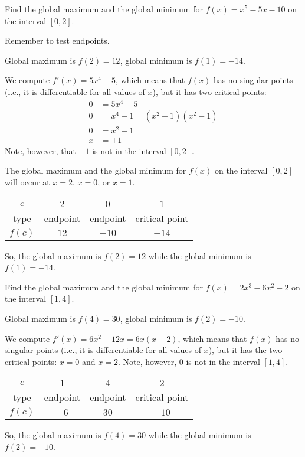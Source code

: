 \begin{question}[2015Q]
Find the global maximum and the global minimum for $f(x)=x^5 - 5x - 10$ on the interval $[0,2]$.
\end{question}
\begin{hint} Remember to test endpoints.
\end{hint}
\begin{answer} Global maximum is $f(2) = 12$, global minimum is $f(1) = -14$.
\end{answer}
\begin{solution} We compute $f'(x)=5x^4-5$, which means that $f(x)$ has no singular points (i.e., it is differentiable for all values of $x$), but it has two critical points:
\begin{align*}
0&=5x^4-5\\
0&=x^4-1=(x^2+1)(x^2-1)\\
0&=x^2-1\\
x&= \pm 1
\end{align*}
Note, however, that $-1$ is not in the interval $[0,2]$.

The global maximum and the
global minimum for $f(x)$ on the interval $[0,2]$ will occur at $x=2$, $x=0$, or $x=1$.
\begin{center}
\begin{tabular}{|c||c|c|c|}
\hline
$c$ & $2$ &  $0$ &  $1$  \\
\hline
type & endpoint & endpoint & critical point  \\
\hline
$f(c)$ & $12$ & $-10$ & $-14$ \\
\hline
\end{tabular}
\end{center}

So, the global maximum is $f(2) = 12$ while the global minimum is $f(1) = -14$.
\end{solution}


\begin{question}[2015Q]\label{s3.5.3given3}
Find the global maximum and the global minimum for $f(x)=2x^3 - 6x^2 - 2$ on the interval $[1,4]$.
\end{question}
\begin{answer}
Global maximum is $f(4) = 30$, global minimum is $f(2) = -10$.
\end{answer}
\begin{solution}
We compute $f'(x)=6x^2 - 12x = 6x(x-2)$, which means that $f(x)$ has no singular points
(i.e., it is differentiable for all values of $x$), but it has the two critical points:
$x=0$ and $x=2$.
Note, however, $0$ is not in the interval $[1,4]$.
\begin{center}
\begin{tabular}{|c||c|c|c|}
\hline
$c$ & $1$ &  $4$ &  $2$  \\
\hline
type & endpoint & endpoint & critical point  \\
\hline
$f(c)$ & $-6$ & $30$ & $-10$ \\
\hline
\end{tabular}
\end{center}

So, the global maximum is $f(4) = 30$ while the global minimum is $f(2) = -10$.
\end{solution}


